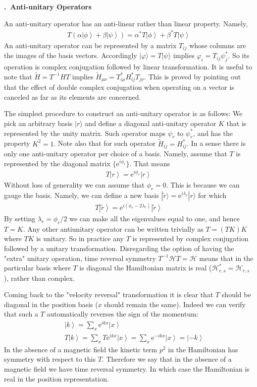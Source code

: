 \documentclass[onecolumn,fleqn, 11pt]{revtex4}
\newcommand{\eexp}{\mathrm{e}^}
\newcommand{\beq}{\begin{eqnarray}}
\newcommand{\eeq}{\end{eqnarray}}
\renewcommand{\thesubsection}{\arabic{subsection}}
\renewcommand{\thesubsubsection}{\arabic{subsubsection}}
\newcommand{\sheadC}[1]
{
\addtocounter{subsubsection}{1}
\vspace{5mm}
{\bf \thesubsection.\thesubsubsection \ #1}  
\nopagebreak
\phantomsection
}
\begin{document}
\sheadC{Anti-unitary Operators} 
 
An anti-unitary operator has an anti-linear 
rather than linear property. Namely,  
\beq
T\left( \alpha \left\vert \phi \right\rangle 
+\beta \left\vert \psi \right\rangle \right) 
= \alpha^* T\left\vert \phi \right\rangle 
+ \beta^* T\left\vert \psi \right\rangle  
\eeq
An anti-unitary operator can be represented 
by a matrix $T_{ij}$ whose columns are the images 
of the basis vectors. 
Accordingly ${|\varphi\rangle = T |\psi\rangle}$ 
implies ${ \varphi_i = T_{ij}\psi_j^* }$.
So its operation is complex conjugation followed 
by linear transformation. 
It is useful to note that ${ \tilde{H} = T^{-1}HT }$ 
implies ${ \tilde{H}_{\mu\nu} = T^{*}_{i\mu} H_{ij}^{*} T_{j\nu} }$.
This is proved by pointing out that the effect 
of double complex conjugation when operating on 
a vector is canceled as far as its elements are concerned.

 
The simplest procedure to construct 
an anti-unitary operator is as follows: 
We pick an arbitrary basis ${|r\rangle}$ 
and define a diagonal anti-unitary operator $K$ 
that is represented by the unity matrix. 
Such operator maps $\psi_r$ to $\psi_r^{*}$,  
and has the property $K^2=1$.
Note also that for such operator ${ \tilde{H}_{ij} = H_{ij}^{*}}$.    
In a sense there is only one anti-unitary 
operator per choice of a basis. Namely, assume 
that $T$ is represented by the diagonal 
matrix ${\{ \eexp{i \phi_{r}} \}}$. That means  
\beq
T\left\vert r\right\rangle = \eexp{i \phi_{r}} \left\vert r\right\rangle 
\eeq
Without loss of generality we can assume 
that $\phi_{r}=0$. This is because we can 
gauge the basis. Namely, we can define 
a new basis $|\tilde{r}\rangle = \eexp{i\lambda_r} |r\rangle$ 
for which  
\beq
T\left\vert \tilde{r} \right\rangle 
= \eexp{ i (\phi_{r} - 2\lambda_r) } \left\vert \tilde{r} \right\rangle 
\eeq
By setting $\lambda_r = \phi_r/2$ we can make 
all the eigenvalues equal to one, and hence $T=K$.
Any other antiunitary operator can be 
written trivially as $T=(TK)K$ where $TK$ is unitary.
So in practice any $T$ is represented 
by complex conjugation followed by a unitary 
transformation.  Disregarding the option of having 
the "extra" unitary operation, time reversal 
symmetry $T^{-1} \mathcal{H} T = \mathcal{H}$
means that in the particular basis 
where $T$ is diagonal the Hamiltonian matrix 
is real ($\mathcal{H}_{r,s}^* = \mathcal{H}_{r,s}$), 
rather than complex. 


Coming back to the "velocity reversal" transformation 
it is clear that $T$ should be diagonal in the position 
basis ($x$ should remain the same). Indeed we can verify 
that such a $T$ automatically reverses the sign of the momentum:
\beq 
&& \left\vert k\right\rangle = \sum_{x}\eexp{ikx}\left\vert x\right\rangle 
\\ \nonumber  
&& T\left\vert k\right\rangle = \sum_{x}T\eexp{ikx}\left\vert x\right\rangle 
=\sum_{x}\eexp{-ikx}\left\vert x\right\rangle =\left\vert -k\right\rangle 
\eeq
In the absence of a magnetic field the kinetic term $p^2$ 
in the Hamiltonian has symmetry with respect to this $T$. 
Therefore we say that in the absence of a magnetic field 
we have time reversal symmetry. In which case the Hamiltonian 
is real in the position representation. 
\end{document}
